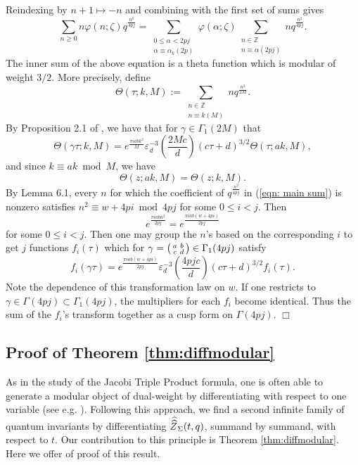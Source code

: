 \documentclass[11pt,letterpaper]{amsart}
\theoremstyle{definition}
\theoremstyle{plain}
\newcommand{\Zhathat}{\widehat{\vphantom{\rule{5pt}{10pt}}\smash{\widehat{Z}}\,}\!}
\numberwithin{equation}{section}
\theoremstyle{example}
\begin{document}
Reindexing by $n+1 \mapsto -n$ and combining with the first set of sums gives
\begin{equation}\label{eqn: main sum} \sum_{n \geq 0} n \varphi(n;\zeta) q^\frac{n^2}{4pj} = \sum_{\substack{0 \leq \alpha < 2pj \\ \alpha \equiv \alpha_k (2p)}} \varphi(\alpha; \zeta) \sum_{\substack{n \in \mathbb{Z}\\ n \equiv \alpha (2pj)}} nq^\frac{n^2}{4pj}.
\end{equation}
The inner sum of the above equation is a theta function which is modular of weight $3/2$. More precisely, define \[\Theta(\tau; k, M):= \sum_{\substack{n \in \mathbb{Z}\\ n \equiv k (M)}} nq^\frac{n^2}{2M}.
\]
By Proposition 2.1 of \cite{shimura}, we have that for $\gamma \in \Gamma_1(2M)$ that
\[\Theta(\gamma \tau; k, M) = e^\frac{\pi i a b k^2}{M}\varepsilon_d^{-3} \left( \frac{2Mc}{d}\right) (c\tau + d)^{3/2} \Theta(\tau; ak, M),\]
and since $k \equiv ak \bmod{M}$, we have
\[\Theta(z; ak, M) = \Theta(z; k, M).
\]
By Lemma 6.1, every $n$ for which the coefficient of $q^\frac{n^2}{4pj}$ in (\ref{eqn: main sum}) is nonzero satisfies $n^2 \equiv w + 4pi \bmod{4pj}$ for some $0 \leq i < j$. 
Then
\[e^\frac{\pi i a b n^2}{2pj} = e^\frac{\pi i a b (w + 4pi)}{2pj}
\]
for some $0 \leq i < j$. Then one may group the $n$'s based on the corresponding $i$ to get $j$ functions $f_{i}(\tau)$ which for $\gamma = \begin{psmallmatrix} a & b \\ c & d \end{psmallmatrix} \in \Gamma_1(4pj)$ satisfy
\[f_{i}(\gamma \tau) = e^\frac{\pi i a b (w + 4pi)}{2pj} \varepsilon_d^{-3} \left( \frac{4pjc}{d}\right)(c\tau + d)^{3/2} f_{i}(\tau).
\]
Note the dependence of this transformation law on $w$. If one restricts to $\gamma \in \Gamma(4pj) \subset \Gamma_1(4pj)$, the multipliers for each $f_i$ become identical. Thus the sum of the $f_i$'s transform together as a cusp form on $\Gamma(4pj)$.
$\Box$

\subsection{Proof of Theorem \ref{thm:diffmodular}}

As in the study of the Jacobi Triple Product formula, one is often able to generate a modular object of dual-weight by differentiating with respect to one variable (see e.g. \cite{coogan-ono}). Following this approach, we find a second infinite family of quantum invariants by differentiating $\Zhathat_\Sigma(t,q)$, summand by summand, with respect to $t$. Our contribution to this principle is Theorem \ref{thm:diffmodular}. Here we offer of proof of this result.
\end{document}
